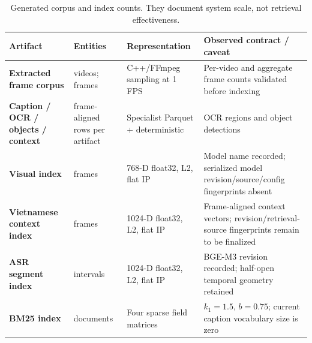 \begin{table}[htbp]
\centering
\caption{Generated corpus and index counts. They document system scale, not
retrieval effectiveness.}
\label{tab:artifacts}
\small
\begin{tabularx}{\textwidth}{@{}>{\bfseries}p{}p{}p{}X@{}}
\toprule
Artifact & Entities & Representation & Observed contract / caveat \\
\midrule
Extracted frame corpus & \ArtifactVideoCount{} videos; \ArtifactFrameCount{} frames & C++/FFmpeg sampling at 1 FPS & Per-video and aggregate frame counts validated before indexing \\
Caption / OCR / objects / context & \ArtifactCaptionCount{} frame-aligned rows per artifact & Specialist Parquet + deterministic \FrameContext{} & \ArtifactOCRRegionCount{} OCR regions and \ArtifactObjectDetectionCount{} object detections \\
Visual index & \ArtifactFrameCount{} frames & 768-D float32, L2, flat IP & Model name recorded; serialized model revision/source/config fingerprints absent \\
Vietnamese context index & \ArtifactContextCount{} frames & 1024-D float32, L2, flat IP & Frame-aligned context vectors; revision/retrieval-source fingerprints remain to be finalized \\
ASR segment index & \ArtifactASRSegmentCount{} intervals & 1024-D float32, L2, flat IP & BGE-M3 revision recorded; half-open temporal geometry retained \\
BM25 index & \ArtifactFrameCount{} documents & Four sparse field matrices & $k_1=1.5$, $b=0.75$; current caption vocabulary size is zero \\
\bottomrule
\end{tabularx}
\end{table}

